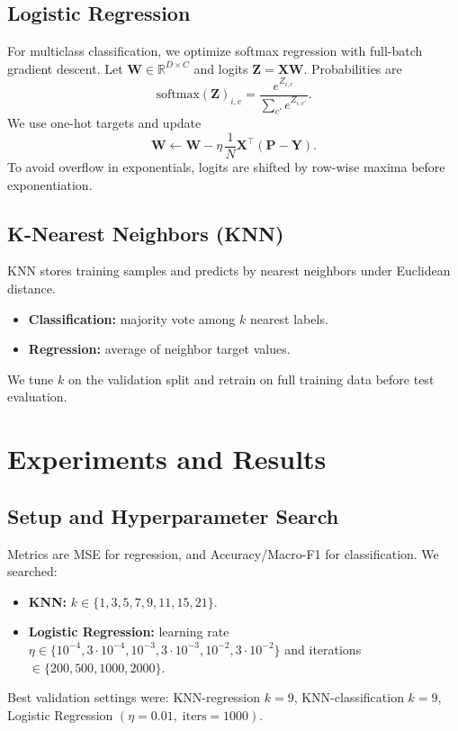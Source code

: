 \documentclass[10pt, twocolumn, letterpaper]{article}
\begin{document}
\subsection{Logistic Regression}
For multiclass classification, we optimize softmax regression with full-batch gradient descent. Let $\mathbf{W}\in\mathbb{R}^{D\times C}$ and logits $\mathbf{Z}=\mathbf{XW}$. Probabilities are
\[
\mathrm{softmax}(\mathbf{Z})_{i,c}=\frac{e^{Z_{i,c}}}{\sum_{c'}e^{Z_{i,c'}}}.
\]
We use one-hot targets and update
\[
\mathbf{W} \leftarrow \mathbf{W} - \eta\,\frac{1}{N}\mathbf{X}^{\top}(\mathbf{P}-\mathbf{Y}).
\]
To avoid overflow in exponentials, logits are shifted by row-wise maxima before exponentiation.

\subsection{K-Nearest Neighbors (KNN)}
KNN stores training samples and predicts by nearest neighbors under Euclidean distance.
\begin{itemize}[noitemsep, nolistsep]
    \item \textbf{Classification:} majority vote among $k$ nearest labels.
    \item \textbf{Regression:} average of neighbor target values.
\end{itemize}
We tune $k$ on the validation split and retrain on full training data before test evaluation.

\section{Experiments and Results}
\subsection{Setup and Hyperparameter Search}
Metrics are MSE for regression, and Accuracy/Macro-F1 for classification. We searched:
\begin{itemize}[noitemsep, nolistsep]
    \item \textbf{KNN:} $k\in\{1,3,5,7,9,11,15,21\}$.
    \item \textbf{Logistic Regression:} learning rate $\eta\in\{10^{-4},3\cdot10^{-4},10^{-3},3\cdot10^{-3},10^{-2},3\cdot10^{-2}\}$ and iterations $\in\{200,500,1000,2000\}$.
\end{itemize}
Best validation settings were: KNN-regression $k=9$, KNN-classification $k=9$, Logistic Regression $(\eta=0.01,\;\text{iters}=1000)$.
\end{document}
